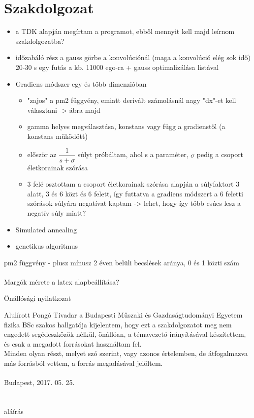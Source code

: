 \documentclass[12pt]{article}
\begin{document}
\section*{Szakdolgozat}
\begin{itemize}
	\item a TDK alapján megírtam a programot, ebből mennyit kell majd leírnom szakdolgozatba?
	\item időzabáló rész a gauss görbe a konvolúciónál (maga a konvolúció elég sok idő) 20-30 s egy futás a kb. 11000 ego-ra + gauss optimalizálása listával
	\item Gradiens módszer egy és több dimenzióban
	\begin{itemize}
		\item "zajos" a pm2 függvény, emiatt derivált számolásnál nagy "dx"-et kell választani -> ábra majd
		\item gamma helyes megválasztása, konstans vagy függ a gradienstől (a konstans működött)
		\item először az $\dfrac{1}{s + \sigma}$ súlyt próbáltam, ahol s a paraméter, $\sigma$ pedig a csoport életkorainak szórása
		\item 3 felé osztottam a csoport életkorainak szórása alapján a súlyfaktort 3 alatt, 3 és 6 közt és 6 felett, így futtatva a gradiens módszert a 6 feletti szórások súlyára negatívat kaptam -> lehet, hogy így több csúcs lesz a negatív súly miatt?
	\end{itemize}
	\item Simulated annealing
	\item genetikus algoritmus
\end{itemize}
pm2 függvény - plusz mínusz 2 éven belüli becslések aránya, 0 és 1 közti szám \\ \\
Margók mérete a latex alapbeállítása?
\fi


\pagebreak
\begin{center}
	{\Huge Önállósági nyilatkozat}
\end{center}
\medskip
Alulírott Pongó Tivadar a Budapesti Műszaki és Gazdaságtudományi Egyetem fizika BSc szakos hallgatója kijelentem, hogy ezt a szakdolgozatot meg nem engedett segédeszközök nélkül, önállóan, a témavezető irányításával készítettem, és csak a megadott forrásokat használtam fel. \\
Minden olyan részt, melyet szó szerint, vagy azonos értelemben, de átfogalmazva más forrásból vettem, a forrás megadásával jelöltem.\\\\
Budapest, 2017. 05. 25. \\ \\ \\ %
\hspace*{100mm}aláírás %
\pagebreak
\tableofcontents
\pagebreak
\end{document}

